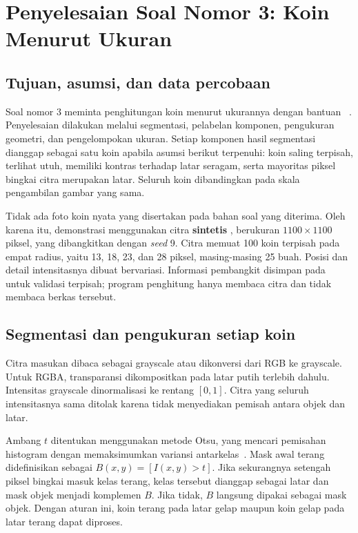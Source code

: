 \section{Penyelesaian Soal Nomor 3: Koin Menurut Ukuran}
\label{sec:soal3}

\subsection{Tujuan, asumsi, dan data percobaan}

Soal nomor 3 meminta penghitungan koin menurut ukurannya dengan bantuan
~\cite{soal-uts}.
Penyelesaian dilakukan melalui segmentasi, pelabelan komponen, pengukuran
geometri, dan pengelompokan ukuran. Setiap komponen hasil segmentasi
dianggap sebagai satu koin apabila asumsi berikut terpenuhi: koin saling
terpisah, terlihat utuh, memiliki kontras terhadap latar seragam, serta
mayoritas piksel bingkai citra merupakan latar. Seluruh koin dibandingkan
pada skala pengambilan gambar yang sama.

Tidak ada foto koin nyata yang disertakan pada bahan soal yang diterima.
Oleh karena itu, demonstrasi menggunakan citra \textbf{sintetis}
, berukuran $1100\times1100$ piksel, yang
dibangkitkan dengan \emph{seed} 9. Citra memuat 100 koin terpisah pada empat
radius, yaitu 13, 18, 23, dan 28 piksel, masing-masing 25 buah. Posisi dan
detail intensitasnya dibuat bervariasi. Informasi pembangkit disimpan pada
 untuk validasi terpisah; program
penghitung hanya membaca citra dan tidak membaca berkas tersebut.

\subsection{Segmentasi dan pengukuran setiap koin}

Citra masukan dibaca sebagai grayscale atau dikonversi dari RGB ke
grayscale. Untuk RGBA, transparansi dikompositkan pada latar putih terlebih
dahulu. Intensitas grayscale dinormalisasi ke rentang $[0,1]$. Citra yang
seluruh intensitasnya sama ditolak karena tidak menyediakan pemisah antara
objek dan latar.

Ambang $t$ ditentukan menggunakan metode Otsu, yang mencari pemisahan
histogram dengan memaksimumkan variansi antarkelas~\cite{skimage-otsu}.
Mask awal terang didefinisikan sebagai $B(x,y)=[I(x,y)>t]$. Jika sekurangnya
setengah piksel bingkai masuk kelas terang, kelas tersebut dianggap
sebagai latar dan mask objek menjadi komplemen $B$. Jika tidak, $B$
langsung dipakai sebagai mask objek. Dengan aturan ini, koin terang pada
latar gelap maupun koin gelap pada latar terang dapat diproses.

